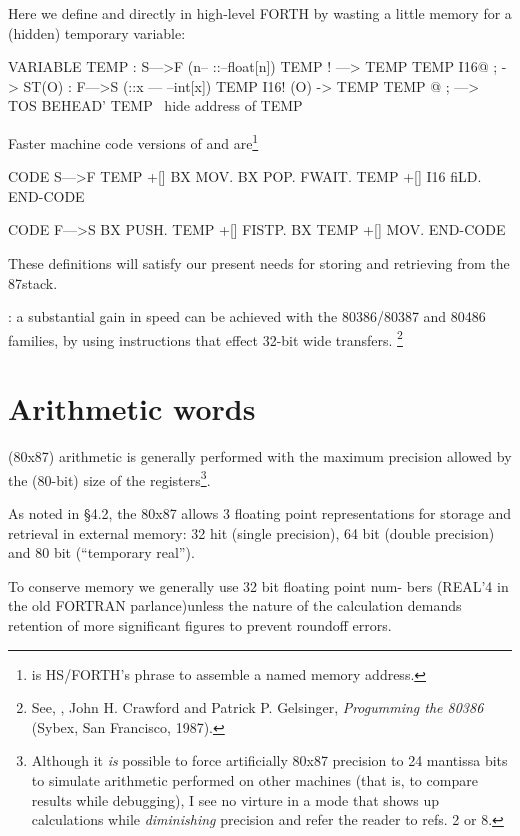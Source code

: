 {{{{Here we define  and  directly in high-level FORTH by wasting a little memory for a (hidden) temporary variable:

\begin{listing}
    VARIABLE TEMP
    : S—>F (n-- ::--float[n])
        TEMP !          \TOS —> TEMP
        TEMP I16@ ;     \TEMP-> ST(O)
    : F—>S (::x — --int[x])
        TEMP I16!       \ST(O) -> TEMP
        TEMP @ ;        \TEMP—> TOS
    BEHEAD' TEMP        \ hide address of TEMP
\end{listing}

Faster machine code versions of  and  are\footnote{ is HS/FORTH's phrase to assemble a named memory address.}

\begin{listing}
    CODE S—>F TEMP +[] BX MOV. BX POP.
        FWAIT. TEMP +[] I16 fiLD. END-CODE

    CODE F—>S BX PUSH. TEMP +[] FISTP.
        BX TEMP +[] MOV. END-CODE
\end{listing}

These definitions will satisfy our present needs for storing and retrieving from the 87stack.

\leftbar[1\linewidth]
\Note: a substantial gain in speed can be achieved with the
80386/80387 and 80486 families, by using instructions that effect
32-bit wide transfers.
\endleftbar \footnote{See, \eg, John H. Crawford and Patrick P. Gelsinger, \textit{Progumming the 80386} (Sybex, San Francisco, 1987).}

\section{Arithmetic words}

 (80x87) arithmetic is generally performed with the maximum precision allowed by the (80-bit) size of the registers\footnote{Although it \textit{is} possible to force artificially 80x87 precision to 24 mantissa bits to simulate arithmetic performed on other machines (that is, to compare results while debugging), I see no virture in a mode that shows up calculations while \textit{diminishing} precision and refer the reader to refs. 2 or 8.}.

As noted in §4.2, the 80x87 allows 3 floating point representations
for storage and retrieval in external memory: 32 hit (single precision),
64 bit (double precision) and 80 bit (“temporary real”).

To conserve memory we generally use 32 bit floating point num-
bers (REAL'4 in the old FORTRAN parlance)unless the nature
of the calculation demands retention of more significant figures
to prevent roundoff errors.

}}}}
